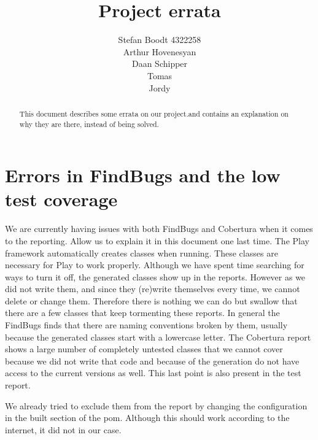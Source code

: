 \documentclass[11pt,a4paper]{report}
\author{Stefan Boodt 4322258\\Arthur Hovenesyan\\Daan Schipper\\Tomas\\Jordy}
\title{Project errata}
\begin{document}
\maketitle
\tableofcontents
\begin{abstract}
This document describes some errata on our project.and contains an explanation on why they are there, instead of being solved.
\end{abstract}
\chapter{Errors in FindBugs and the low test coverage}
We are currently having issues with both FindBugs and Cobertura when it comes to the reporting. Allow us to explain it in this document one last time. The Play framework automatically creates classes when running. These classes are necessary for Play to work properly. Although we have spent time searching for ways to turn it off, the generated classes show up in the reports. However as we did not write them, and since they (re)write themselves every time, we cannot delete or change them. Therefore there is nothing we can do but swallow that there are a few classes that keep tormenting these reports. In general the FindBugs finds that there are naming conventions broken by them, usually because the generated classes start with a lowercase letter. The Cobertura report shows a large number of completely untested classes that we cannot cover because we did not write that code and because of the generation do not have access to the current versions as well. This last point is also present in the test report.

We already tried to exclude them from the report by changing the configuration in the built section of the pom. Although this should work according to the internet, it did not in our case.
\end{document}
